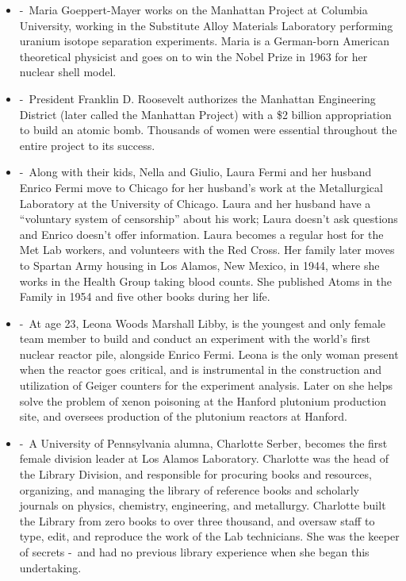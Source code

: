 \documentclass[12pt,a4paper]{article}
\begin{document}
\begin{enumerate}
\begin{itemize}
      \item[]  -\ Maria Goeppert-Mayer works on the Manhattan Project at Columbia University, working in the Substitute Alloy Materials Laboratory performing uranium isotope separation experiments. Maria is a German-born American theoretical physicist and goes on to win the Nobel Prize in 1963 for her nuclear shell model.
      \item[]  -\ President Franklin D. Roosevelt authorizes the Manhattan Engineering District (later called the Manhattan Project) with a \$2 billion appropriation to build an atomic bomb. Thousands of women were essential throughout the entire project to its success.
      \item[]  -\ Along with their kids, Nella and Giulio, Laura Fermi and her husband Enrico Fermi move to Chicago for her husband's work at the Metallurgical Laboratory at the University of Chicago. Laura and her husband have a ``voluntary system of censorship'' about his work; Laura doesn't ask questions and Enrico doesn't offer information. Laura becomes a regular host for the Met Lab workers, and volunteers with the Red Cross. Her family later moves to Spartan Army housing in Los Alamos, New Mexico, in 1944, where she works in the Health Group taking blood counts. She published Atoms in the Family in 1954 and five other books during her life.
      \item[]  -\ At age 23, Leona Woods Marshall Libby, is the youngest and only female team member to build and conduct an experiment with the world's first nuclear reactor pile, alongside Enrico Fermi. Leona is the only woman present when the reactor goes critical, and is instrumental in the construction and utilization of Geiger counters for the experiment analysis. Later on she helps solve the problem of xenon poisoning at the Hanford plutonium production site, and oversees production of the plutonium reactors at Hanford.
      \item[]  -\ A University of Pennsylvania alumna, Charlotte Serber, becomes the first female division leader at Los Alamos Laboratory. Charlotte was the head of the Library Division, and responsible for procuring books and resources, organizing, and managing the library of reference books and scholarly journals on physics, chemistry, engineering, and metallurgy. Charlotte built the Library from zero books to over three thousand, and oversaw staff to type, edit, and reproduce the work of the Lab technicians. She was the keeper of secrets -\ and had no previous library experience when she began this undertaking.

\end{itemize}
\end{enumerate}
\end{document}

